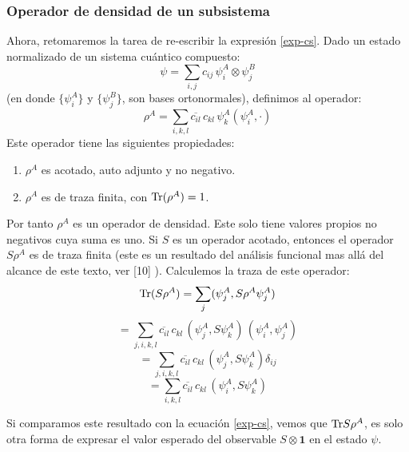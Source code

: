 \documentclass[12pt]{book}
\numberwithin{equation}{chapter}
\def\ol{\overline}
\def\pr{\otimes}
\def\1{\mathbf{1}}
\def\Tr{\hbox{Tr}}
\begin{document}
\subsubsection{Operador de densidad de un subsistema}
Ahora, retomaremos la tarea de re-escribir la expresi\'on \eqref{exp-cs}. Dado un estado normalizado de un sistema cu\'antico compuesto:
\begin{equation}
\psi = \sum_{i,j} c_{ij} \, \psi_{i}^{A} \pr \psi_{j}^{B}
\end{equation}
(en donde $\{ \psi_{i}^{A} \}$ y $\{ \psi_{j}^{B} \}$, son bases ortonormales), definimos al operador:
\begin{equation}
\rho^{A}= \sum_{i,k,l} \ol{c_{il}}\, c_{kl}\, \psi_{k}^{A} ( \psi_{i}^{A} , \cdot ) 
\end{equation}
Este operador tiene las siguientes propiedades:
\begin{enumerate}
\item $\rho^{A}$ es acotado, auto adjunto y no negativo.
\item $\rho^{A}$ es de traza finita, con $\Tr (\rho^{A})=1$.
\end{enumerate}

Por tanto $\rho^{A}$ es un operador de densidad. Este solo tiene valores propios no negativos cuya suma es uno. Si $S$ es un operador acotado, entonces el operador $S\rho^{A}$ es de traza finita (este es un resultado del an\'alisis funcional mas all\'a del alcance de este texto, ver [10] ). Calculemos la traza de este operador:
$$ \Tr (S \rho^{A})= \sum_{j} ( \psi_{j}^{A},S \rho^{A} \psi_{j}^{A} )  $$
$$= \sum_{j,i,k,l} \ol{c_{il}}\,c_{kl}\, ( \psi_{j}^{A},S\psi_{k}^{A} )\, ( \psi_{i}^{A},\psi_{j}^{A} )  $$
$$ = \sum_{j,i,k,l} \ol{c_{il}}\,c_{kl}\, ( \psi_{j}^{A},S\psi_{k}^{A} ) \delta_{ij} $$
\begin{equation}
=\sum_{i,k,l} \ol{c_{il}}\, c_{kl}\, ( \psi_{i}^{A},S \psi_{k}^{A})
\end{equation}

Si comparamos este resultado con la ecuaci\'on \eqref{exp-cs}, vemos que $\Tr S \rho^{A}$, es solo otra forma de expresar el valor esperado del observable $S \pr \1$ en el estado $\psi$.
\end{document}

